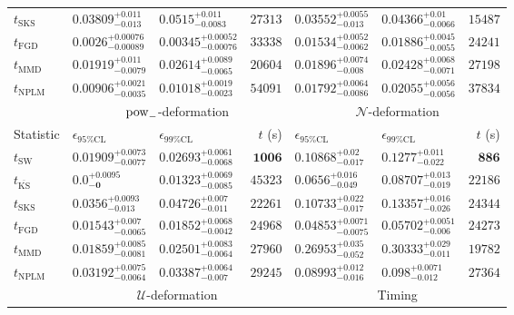 \begin{tabular}{l|llr|llr}
	$t_{\mathrm{SKS}}$ & $0.03809_{-0.013}^{+0.011}$ & $0.0515_{-0.0083}^{+0.011}$ & $27313$ & $0.03552_{-0.013}^{+0.0055}$ & $0.04366_{-0.0066}^{+0.01}$ & $15487$ \\
	$t_{\mathrm{FGD}}$ & ${\mathbf{0.0026_{-0.00089}^{+0.00076}}}$ & ${\mathbf{0.00345_{-0.00076}^{+0.00052}}}$ & $33338$ & $0.01534_{-0.0062}^{+0.0052}$ & $0.01886_{-0.0055}^{+0.0045}$ & $24241$ \\
	$t_{\mathrm{MMD}}$ & $0.01919_{-0.0079}^{+0.011}$ & $0.02614_{-0.0065}^{+0.0089}$ & $20604$ & $0.01896_{-0.008}^{+0.0074}$ & $0.02428_{-0.0071}^{+0.0068}$ & $27198$ \\
\rowcolor{red!35}	$t_{\mathrm{NPLM}}$ & $0.00906_{-0.0035}^{+0.0021}$ & $0.01018_{-0.0023}^{+0.0019}$ & $54091$ & $0.01792_{-0.0086}^{+0.0064}$ & $0.02055_{-0.0056}^{+0.0056}$ & $37834$ \\
	\toprule
	\multicolumn{1}{c}{} & \multicolumn{3}{c}{$\rm{pow}_{-}$-deformation} & \multicolumn{3}{c}{$\mathcal{N}$-deformation} \\
Statistic & $\epsilon_{95\%\mathrm{CL}}$ & $\epsilon_{99\%\mathrm{CL}}$ & $t$ (s) & $\epsilon_{95\%\mathrm{CL}}$ & $\epsilon_{99\%\mathrm{CL}}$ & $t$ (s) \\
	\midrule
	$t_{\mathrm{SW}}$ & $0.01909_{-0.0077}^{+0.0073}$ & $0.02693_{-0.0068}^{+0.0061}$ & ${\mathbf{1006}}$ & $0.10868_{-0.017}^{+0.02}$ & $0.1277_{-0.022}^{+0.011}$ & ${\mathbf{886}}$ \\
	$t_{\overline{\mathrm{KS}}}$ & ${\mathbf{0.0_{-0}^{+0.0095}}}$ & ${\mathbf{0.01323_{-0.0085}^{+0.0069}}}$ & $45323$ & $0.0656_{-0.049}^{+0.016}$ & $0.08707_{-0.019}^{+0.013}$ & $22186$ \\
	$t_{\mathrm{SKS}}$ & $0.0356_{-0.013}^{+0.0093}$ & $0.04726_{-0.011}^{+0.007}$ & $22261$ & $0.10733_{-0.017}^{+0.022}$ & $0.13357_{-0.026}^{+0.016}$ & $24344$ \\
	$t_{\mathrm{FGD}}$ & $0.01543_{-0.0065}^{+0.007}$ & $0.01852_{-0.0042}^{+0.0068}$ & $24968$ & ${\mathbf{0.04853_{-0.0075}^{+0.0071}}}$ & ${\mathbf{0.05702_{-0.006}^{+0.0051}}}$ & $24273$ \\
	$t_{\mathrm{MMD}}$ & $0.01859_{-0.0081}^{+0.0085}$ & $0.02501_{-0.0064}^{+0.0083}$ & $27960$ & $0.26953_{-0.052}^{+0.035}$ & $0.30333_{-0.011}^{+0.029}$ & $19782$ \\
\rowcolor{red!35}	$t_{\mathrm{NPLM}}$ & $0.03192_{-0.0064}^{+0.0075}$ & $0.03387_{-0.007}^{+0.0064}$ & $29245$ & $0.08993_{-0.016}^{+0.012}$ & $0.098_{-0.012}^{+0.0071}$ & $27364$ \\
	\toprule
	\multicolumn{1}{c}{} & \multicolumn{3}{c}{$\mathcal{U}$-deformation} & \multicolumn{3}{c}{Timing} \\

\end{tabular}
